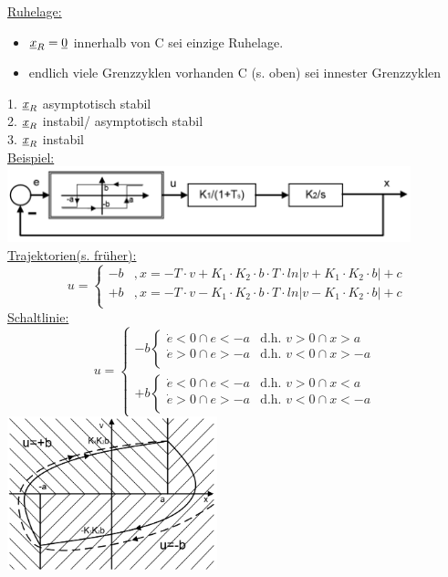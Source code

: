 \documentclass[openany,a4paper,11pt]{book}
\begin{document}
\uline{Ruhelage:} \begin{itemize}
    \item $\uline{x}_R=\uline{0}$ innerhalb von C sei einzige Ruhelage.
    \item endlich viele Grenzzyklen vorhanden C (s. oben) sei innester Grenzzyklen
\end{itemize}
1. $\uline{x}_R$ asymptotisch stabil\\
2. $\uline{x}_R$ instabil/ asymptotisch stabil\\
3. $\uline{x}_R$ instabil\\
\uline{Beispiel:}\\
\includegraphics[width=4.6in]{imgs/NLR26.png}\\
\uline{Trajektorien(s. früher):}
\[u = \left \{%
\begin{array}{lcrcl}
     -b & ,x=-T\cdot v+K_1\cdot K_2\cdot b\cdot T\cdot ln\big|v+K_1\cdot K_2\cdot b\big|+c\\
     +b & ,x=-T\cdot v-K_1\cdot K_2\cdot b\cdot T\cdot ln\big|v-K_1\cdot K_2\cdot b\big|+c\\
\end{array} \right.
\]
\uline{Schaltlinie:}
\[u = \left \{%
\begin{array}{lcrcl}
     -b \left \{%
\begin{array}{llrcl}
     \dot{e}<0\cap e<-a & \text{d.h. } v>0\cap x>a\\
     \dot{e}>0\cap e>-a & \text{d.h. } v<0\cap x>-a\\
\end{array} \right. \\
     +b \left \{%
\begin{array}{llrcl}
     \dot{e}<0\cap e<-a & \text{d.h. } v>0\cap x<a\\
     \dot{e}>0\cap e>-a & \text{d.h. } v<0\cap x<-a\\
\end{array} \right.
\end{array} \right.
\]
\includegraphics[width=2.4in]{imgs/NLR27.png}
\end{document}
